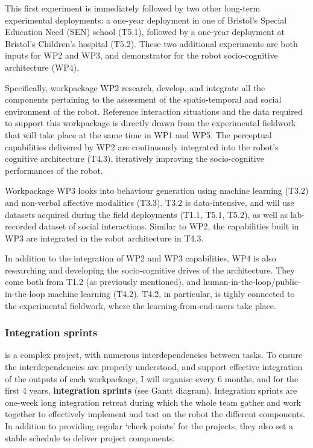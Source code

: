\begin{rewrite}
This first experiment is immediately followed by two other long-term
experimental deployments: a one-year deployment in one of Bristol's Special
Education Need (SEN) school (T5.1), followed by a one-year deployment at
Bristol's Children's hospital (T5.2). These two additional experiments are both
inputs for WP2 and WP3, and demonstrator for the robot socio-cognitive
architecture (WP4).

Specifically, workpackage WP2 research, develop, and integrate all the components
pertaining to the assessment of the spatio-temporal and social environment of
the robot. Reference interaction situations and the data required to support
this workpackage is directly drawn from the experimental fieldwork that will
take place at the same time in WP1 and WP5. The perceptual capabilities
delivered by WP2 are continuously integrated into the robot's cognitive
architecture (T4.3), iteratively improving the socio-cognitive performances of
the robot.

Workpackage WP3 looks into behaviour generation using machine learning (T3.2)
and non-verbal affective modalities (T3.3). T3.2 is data-intensive, and will use
datasets acquired during the field deployments (T1.1, T5.1, T5.2), as well as
lab-recorded dataset of social interactions. Similar to WP2, the capabilities
built in WP3 are integrated in the robot architecture in T4.3.

In addition to the integration of WP2 and WP3 capabilities, WP4 is also
researching and developing the socio-cognitive drives of the architecture. They
come both from T1.2 (as previously mentioned), and
human-in-the-loop/public-in-the-loop machine learning (T4.2). T4.2, in
particular, is tighly connected to the experimental fieldwork, where the
learning-from-end-users take place.

\end{rewrite}

\subsubsection{Integration sprints}

\project is a complex project, with numerous interdependencies between tasks.
To ensure the interdependencies are properly understood, and support effective
integration of the outputs of each workpackage, I will organise every 6 months,
and for the first 4 years, \textbf{integration sprints} (see Gantt diagram).
Integration sprints are one-week long integration retreat during which the whole
\project team gather and work together to effectively implement and test on the
robot the different components. In addition to providing regular `check points'
for the projects, they also set a stable schedule to deliver project components.

